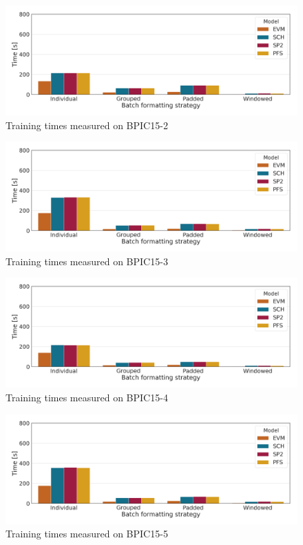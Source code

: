 \begin{figure}
    \centering
    \includegraphics[width=\textwidth]{gfx/bpic2015_2/train_timings.png}
    \caption{Training times measured on BPIC15-2}
    \label{fig:BPIC15-2-training-timings}
\end{figure}
\begin{figure}
    \centering
    \includegraphics[width=\textwidth]{gfx/bpic2015_3/train_timings.png}
    \caption{Training times measured on BPIC15-3}
    \label{fig:BPIC15-3-training-timings}
\end{figure}
\begin{figure}
    \centering
    \includegraphics[width=\textwidth]{gfx/bpic2015_4/train_timings.png}
    \caption{Training times measured on BPIC15-4}
    \label{fig:BPIC15-4-training-timings}
\end{figure}
\begin{figure}
    \centering
    \includegraphics[width=\textwidth]{gfx/bpic2015_5/train_timings.png}
    \caption{Training times measured on BPIC15-5}
    \label{fig:BPIC15-5-training-timings}
\end{figure}
\FloatBarrier

